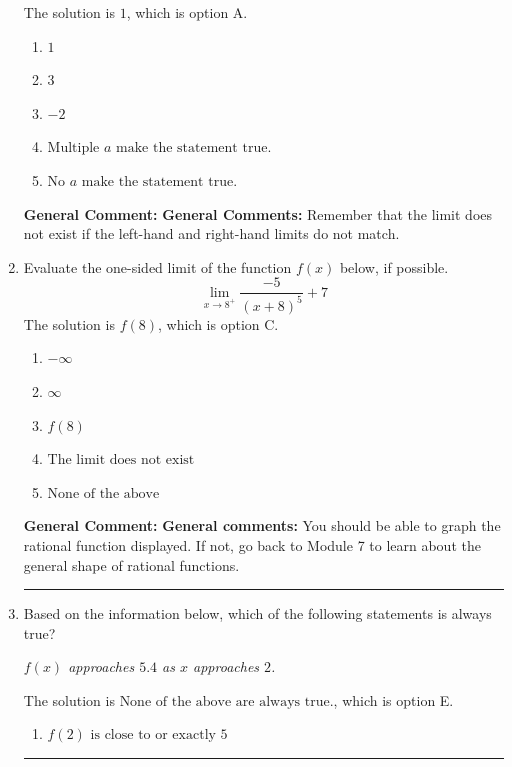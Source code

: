 \documentclass{extbook}[14pt]
\newcommand{\litem}[1]{\item #1

\rule{\textwidth}{0.4pt}}
\begin{document}
\begin{enumerate}
{The solution is \( 1 \), which is option A.\begin{enumerate}[label=\Alph*.]
\item \( 1 \)


\item \( 3 \)


\item \( -2 \)


\item \( \text{Multiple } a \text{ make the statement true}. \)


\item \( \text{No } a \text{ make the statement true}. \)


\end{enumerate}

\textbf{General Comment:} \textbf{General Comments:} Remember that the limit does not exist if the left-hand and right-hand limits do not match.
}
\litem{
Evaluate the one-sided limit of the function $f(x)$ below, if possible.
\[ \lim_{x \rightarrow 8^+} \frac{-5}{(x+8)^5}+7 \]The solution is \( f(8) \), which is option C.\begin{enumerate}[label=\Alph*.]
\item \( -\infty \)


\item \( \infty \)


\item \( f(8) \)


\item \( \text{The limit does not exist} \)


\item \( \text{None of the above} \)


\end{enumerate}

\textbf{General Comment:} \textbf{General comments:} You should be able to graph the rational function displayed. If not, go back to Module 7 to learn about the general shape of rational functions.
}
\litem{
Based on the information below, which of the following statements is always true?

\begin{center}
    \textit{ $f(x)$ approaches $5.4$ as $x$ approaches $2$. }
\end{center}
The solution is \( \text{None of the above are always true.} \), which is option E.\begin{enumerate}[label=\Alph*.]
\item \( f(2) \text{ is close to or exactly } 5 \)



\end{enumerate}}
\end{enumerate}
\end{document}

